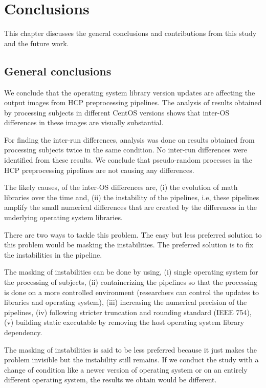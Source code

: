 \chapter{Conclusions}\label{conclusion}
This chapter discusses the general conclusions and contributions from this study and the future work.

\section{General conclusions}
We conclude that the operating system library 
version updates are affecting the output images from HCP preprocessing 
pipelines. The analysis of results obtained by processing subjects in 
different CentOS versions shows that inter-OS differences in these 
images are visually substantial.

For finding the inter-run differences, analysis was done on results 
obtained from processing subjects twice in the same condition. No 
inter-run differences were identified from these results. We 
conclude that pseudo-random processes in the HCP preprocessing pipelines are not causing any differences.

The likely causes, of the inter-OS differences are, (i) the evolution 
of math libraries over the time and, (ii) the instability of the pipelines, i.e, 
these pipelines amplify the small numerical differences that are 
created by the differences in the underlying operating system 
libraries.

There are two ways to tackle this problem. The easy but less preferred 
solution to this problem would be masking the instabilities. The 
preferred solution is to fix the instabilities in the pipeline.

The masking of instabilities can be done by using, (i) single operating 
system for the processing of subjects, (ii) containerizing the 
pipelines so that the processing is done on a more controlled 
environment (researchers can control the updates to libraries and 
operating system), (iii) increasing the numerical precision of the 
pipelines, (iv) following stricter truncation and rounding standard 
(IEEE 754), (v) building static executable by removing the host 
operating system library dependency.

The masking of instabilities is said to be less preferred because it just 
makes the problem invisible but the instability still remains. If we 
conduct the study with a change of condition like a newer version of 
operating system or on an entirely different operating system, the 
results we obtain would be different.

